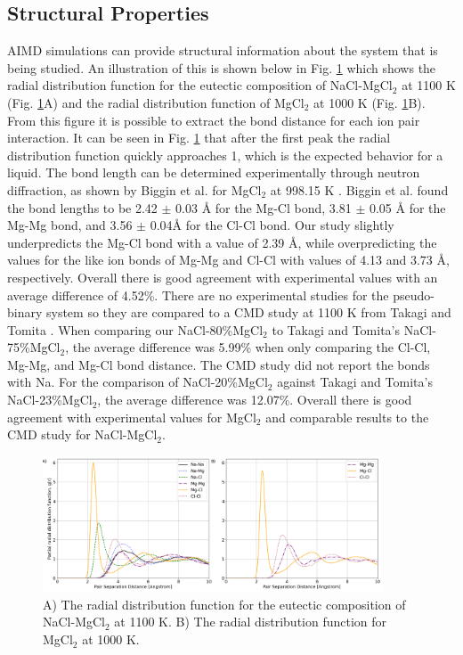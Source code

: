 \documentclass[review]{elsarticle}
\begin{document}
\FloatBarrier

\subsection{Structural Properties}

AIMD simulations can provide structural information about the system that is being studied. An illustration of this is shown below in Fig. \ref{fig:rdf} which shows the radial distribution function for the eutectic composition of NaCl-MgCl$_2$ at 1100 K (Fig. \ref{fig:rdf}A) and the radial distribution function of MgCl$_2$ at 1000 K (Fig. \ref{fig:rdf}B). From this figure it is possible to extract the bond distance for each ion pair interaction. It can be seen in Fig. \ref{fig:rdf} that after the first peak the radial distribution function quickly approaches 1, which is the expected behavior for a liquid. The bond length can be determined experimentally through neutron diffraction, as shown by Biggin et al. for MgCl$_2$ at 998.15 K \cite{biggin1984structures}. Biggin et al. found the bond lengths to be 2.42 $\pm$ 0.03 \r{A} for the Mg-Cl bond, 3.81 $\pm$ 0.05 \r{A} for the Mg-Mg bond, and  3.56 $\pm$ 0.04\r{A} for the Cl-Cl bond. Our study slightly underpredicts the Mg-Cl bond with a value of 2.39 \r{A}, while overpredicting the values for the like ion bonds of Mg-Mg and Cl-Cl with values of 4.13 and 3.73 \r{A}, respectively. Overall there is good agreement with experimental values with an average difference of 4.52\%. There are no experimental studies for the pseudo-binary system so they are compared to a CMD study at 1100 K from Takagi and Tomita \cite{takagi1993structure}. When comparing our NaCl-80\%MgCl$_2$ to Takagi and Tomita's NaCl-75\%MgCl$_2$, the average difference was 5.99\% when only comparing the Cl-Cl, Mg-Mg, and Mg-Cl bond distance. The CMD study did not report the bonds with Na. For the comparison of NaCl-20\%MgCl$_2$ against Takagi and Tomita's NaCl-23\%MgCl$_2$, the average difference was 12.07\%. Overall there is good agreement with experimental values for MgCl$_2$ and comparable results to the CMD study for NaCl-MgCl$_2$.

\begin{figure}[h]
 \centering
 \includegraphics[width=0.9\textwidth]{rdf_from_vasppy.png} 
 \caption{A) The radial distribution function for the eutectic composition of NaCl-MgCl$_2$ at 1100 K. B) The radial distribution function for MgCl$_2$ at 1000 K.}
 \label{fig:rdf}
\end{figure} 
\end{document}
